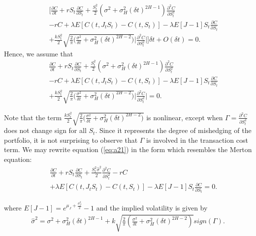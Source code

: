 \documentclass[a4paper,11pt]{amsart}
\numberwithin{equation}{section}
\theoremstyle{definition}
\theoremstyle{plain}
\theoremstyle{definition}
\newcommand{\1}{\mathbf{1}}
\begin{document}
\begin{eqnarray}
&&\Big[\frac{\partial C}{\partial t}+rS_t\frac{\partial C}{\partial S_t}+\frac{S_t^2}{2}(\sigma^2+\sigma_H^2(\delta t)^{2H-1})\frac{\partial^2 C}{\partial S_t^2}\nonumber\\
&&-rC+\lambda E[C(t,J_tS_t)-C(t,S_t)]-\lambda E[J-1]S_t\frac{\partial C}{\partial S_t}\nonumber\\
&&+\frac{kS_t^2}{2}\sqrt{\frac{2}{\pi}\big(\frac{\sigma^2}{\delta t} +\sigma_H^2(\delta t)^{2H-2}\big)}\Big|\frac{\partial^2 C}{\partial S_t^2}\Big|\Big]\delta t+O(\delta t)=0.
\label{eq:a20}
\end{eqnarray}
Hence, we assume that
\begin{eqnarray}
&&\frac{\partial C}{\partial t}+rS_t\frac{\partial C}{\partial S_t}+\frac{S_t^2}{2}(\sigma^2+\sigma_H^2(\delta t)^{2H-1})\frac{\partial^2 C}{\partial S_t^2}\nonumber\\
&&-rC+\lambda E[C(t,J_tS_t)-C(t,S_t)]-\lambda E[J-1]S_t\frac{\partial C}{\partial S_t}\nonumber\\
&&+\frac{kS_t^2}{2}\sqrt{\frac{2}{\pi}\big(\frac{\sigma^2}{\delta t} +\sigma_H^2(\delta t)^{2H-2}\big)}\Big|\frac{\partial^2 C}{\partial S_t^2}\Big|=0.
\label{eq:a21}
\end{eqnarray}

Note that the term $\frac{kS_t^2}{2}\sqrt{\frac{2}{\pi}\big(\frac{\sigma^2}{\delta t} +\sigma_H^2(\delta t)^{2H-2}\big)}$ is nonlinear, except when $\Gamma=\frac{\partial^2 C}{\partial S_t^2}$ does not change sign for all $S_t$. Since it represents the degree of mishedging of the portfolio, it is not surprising to observe that $\Gamma$ is involved in the transaction cost term. We may rewrite equation (\ref{eq:a21}) in the form which resembles the Merton equation:
\begin{eqnarray}
&&\frac{\partial C}{\partial t}+rS_t\frac{\partial C}{\partial S_t}+\frac{S_t^2\widehat{\sigma}^2}{2}\frac{\partial^2 C}{\partial S_t^2}-rC\nonumber\\
&&+\lambda E[C(t,J_tS_t)-C(t,S_t)]-\lambda E[J-1]S_t\frac{\partial C}{\partial S_t}=0.
\label{eq:a22}
\end{eqnarray}

where $E[J-1]=e^{\mu_J+\frac{\sigma_J^2}{2}}-1$ and the implied volatility is given by
\begin{eqnarray}
\widehat{\sigma}^2=\sigma^2+\sigma_H^2(\delta t)^{2H-1}+k\sqrt{\frac{2}{\pi}\left(\frac{\sigma^2}{\delta t}+\sigma_H^2(\delta t)^{2H-2}\right)}sign(\Gamma).
\label{eq:a23}
\end{eqnarray}
\end{document}
